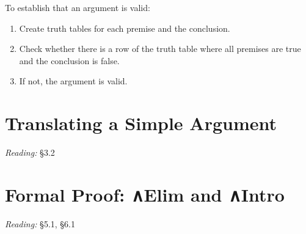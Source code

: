 \documentclass[12pt]{extarticle}
\begin{document}
\begin{multicols*}{3}
\begin{minipage}{\columnwidth}
 
To establish that an argument is valid:
 
\begin{enumerate}
 
\item Create truth tables for each premise and the conclusion.
 
\item Check whether there is a row of the truth table where all premises are true and the conclusion is false.
 
\item If not, the argument is valid.
 
\end{enumerate}
 
\end{minipage}
 
 
 
\section{Translating a Simple Argument}
 
\emph{Reading:} §3.2
 
 
 
\section{Formal Proof: ∧Elim and ∧Intro}
 
\emph{Reading:} §5.1, §6.1
 

\end{multicols*}
\end{document}
